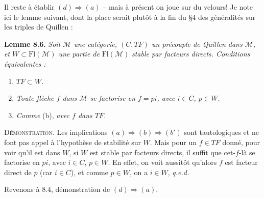 \documentclass[11pt]{article}
\newcommand{\msp}[1]{\marginpar{\raggedright\footnotesize [#1]}}
\begin{document}
Il reste à établir $(d) \Longrightarrow (a)$ – mais à présent on joue sur du velours! Je note ici le lemme suivant, dont la place serait plutôt à la fin du \S4 des généralités sur les triples de Quillen :

\msp{page 109}

\textbf{Lemme 8.6.} \textit{Soit $\mathcal{M}$ une catégorie, $(C,TF)$ un précouple de Quillen dans $\mathcal{M}$, et $W \subset \mathrm{Fl}(\mathcal{M})$ une partie de} $\mathrm{Fl}(\mathcal{M})$ \textit{stable par facteurs directs. Conditions équivalentes :}
\begin{enumerate}[leftmargin=2.5em]
\item[a)] \textit{$TF \subset W$.}
\item[b)] \textit{Toute flèche $f$ dans $\mathcal{M}$ se factorise en $f = pi$, avec $i \in C$, $p \in W$.}
\item[b$'$)] \textit{Comme} (b), \textit{avec $f$ dans $TF$.}
\end{enumerate}

\textsc{Démonstration}. Les implications $(a) \Longrightarrow (b) \Longrightarrow (b')$ sont tautologiques et ne font pas appel à l'hypothèse de stabilité sur $W$. Mais pour un $f \in TF$ donné, pour voir qu'il est dans $W$, si $W$ est stable par facteurs directs, il suffit que cet-$f$-là se factorise en $pi$, avec $i \in C$, $p \in W$. En effet, on voit aussitôt qu'alors $f$ est facteur direct de $p$ (car $i \in C$), et comme $p \in W$, on a $i \in W$, \quad \textit{q.e.d.} %

Revenons à 8.4, démonstration de $(d) \Longrightarrow (a)$.



\msp{page 110}
\end{document}
